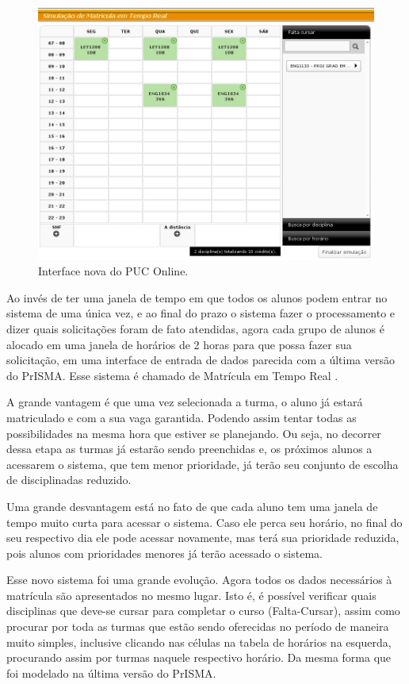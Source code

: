\documentclass[graduacao,brazil]{ThesisPUC}
\begin{document}
\begin{figure}[H]
    \centering
    \includegraphics[width=\linewidth]{img/puc_online_novo.png}
    \caption{Interface nova do PUC Online.}
\end{figure}

Ao invés de ter uma janela de tempo em que todos os alunos podem entrar no sistema de uma única vez, e ao final do prazo o sistema fazer o processamento e dizer quais solicitações foram de fato atendidas, agora cada grupo de alunos é alocado em uma janela de horários de 2 horas para que possa fazer sua solicitação, em uma interface de entrada de dados parecida com a última versão do PrISMA. Esse sistema é chamado de Matrícula em Tempo Real \cite{MatriculaTempoReal}.

A grande vantagem é que uma vez selecionada a turma, o aluno já estará matriculado e com a sua vaga garantida. Podendo assim tentar todas as possibilidades na mesma hora que estiver se planejando. Ou seja, no decorrer dessa etapa as turmas já estarão sendo preenchidas e, os próximos alunos a acessarem o sistema, que tem menor prioridade, já terão seu conjunto de escolha de disciplinadas reduzido.

Uma grande desvantagem está no fato de que cada aluno tem uma janela de tempo muito curta para acessar o sistema. Caso ele perca seu horário, no final do seu respectivo dia ele pode acessar novamente, mas terá sua prioridade reduzida, pois alunos com prioridades menores já terão acessado o sistema.

Esse novo sistema foi uma grande evolução. Agora todos os dados necessários à matrícula são apresentados no mesmo lugar. Isto é, é possível verificar quais disciplinas que deve-se cursar para completar o curso (Falta-Cursar), assim como procurar por toda as turmas que estão sendo oferecidas no período de maneira muito simples, inclusive clicando nas células na tabela de horários na esquerda, procurando assim por turmas naquele respectivo horário. Da mesma forma que foi modelado na última versão do PrISMA.
\end{document}
